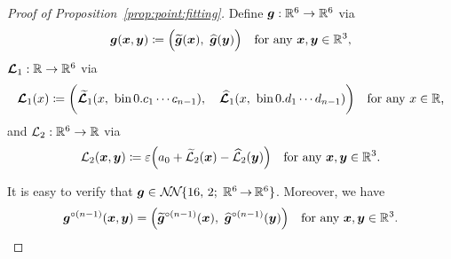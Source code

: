 \documentclass[nohyperref]{article}
\theoremstyle{plain}
\theoremstyle{definition}
\theoremstyle{remark}
\begin{document}
\begin{proof}[Proof of Proposition~\ref{prop:point:fitting}]
	Define $\bmg:\R^6\to\R^6$ via 
	\begin{equation*}
		\bmg(\bmx,\bmy)\coloneqq \Big(\bmtildeg(\bmx),\  \bmhatg(\bmy)\Big)\quad \tn{for any $\bmx,\bmy\in \R^3$,}
	\end{equation*}
	$\bmcalL_1:\R\to\R^6$ via
	\begin{equation*}
		\bmcalL_1(x)\coloneqq \bigg(\bmtildecalL_1(x, \  \bin 0.c_1\cdots c_{n-1})
		,\quad
		\bmhatcalL_1(x, \  \bin 0.d_1\cdots d_{n-1})\bigg)\quad \tn{for any $x\in \R$,}
	\end{equation*}
	and $\calL_{2}:\R^6\to \R$ via
	\begin{equation*}
		\calL_{2}(\bmx,\bmy)\coloneqq \eps  \Big(a_0+\tildecalL_2(\bmx)-\hatcalL_2(\bmy)\Big)\quad \tn{for any $\bmx,\bmy\in \R^3$.}
	\end{equation*}
 
	
	
	
	
	It is easy to verify that $\bmg\in \nn{16}{2}{6}{6}$. Moreover, 
	we have 
	\begin{equation*}
		\bmg^{\circ (n-1)}(\bmx,\bmy)=\Big(\bmtildeg^{\circ (n-1)}(\bmx),\  \bmhatg^{\circ (n-1)}(\bmy)\Big)\quad \tn{for any $\bmx,\bmy\in\R^3$.}
	\end{equation*}
	

\end{proof}
\end{document}
